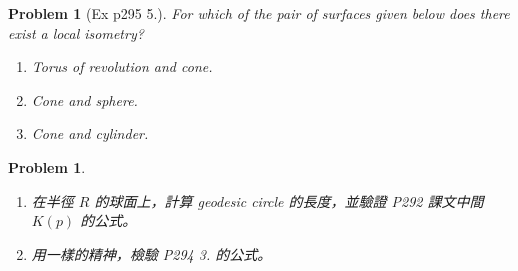 \documentclass[10pt,a4paper]{article}
\newcounter{theProblemCounter}
\newtheorem{problem}[theProblemCounter]{Problem}
\begin{document}
\setcounter{theProblemCounter}{4}
\begin{problem}[Ex p295 5.]
For which of the pair of surfaces given below does there exist a local isometry?
\begin{enumerate}
\item[(a)] Torus of revolution and cone.
\item[(b)] Cone and sphere.
\item[(c)] Cone and cylinder.
\end{enumerate}
\end{problem}

\setcounter{theProblemCounter}{7}
\begin{problem}\hspace*{1em}
\begin{enumerate}
\item[(a)] 在半徑 $R$ 的球面上，計算 geodesic circle 的長度，並驗證 P292 課文中間 $K(p)$ 的公式。
\item[(b)] 用一樣的精神，檢驗 P294 3. 的公式。
\end{enumerate}
\end{problem}
\end{document}
